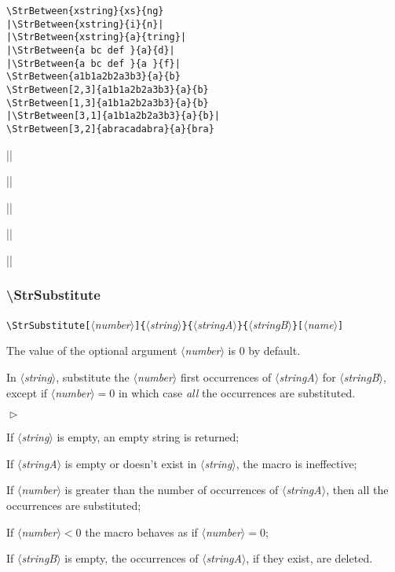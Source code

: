 \documentclass[a4paper,10pt]{article}
\newcommand\argu[1]{$\langle$\textit{#1}$\rangle$}
\newcommand\ARGU[1]{\texttt{\{}\argu{#1}\texttt{\}}}
\newcommand\arguC[1]{\texttt{[}\argu{#1}\texttt{]}}
\newenvironment{Conditions}[1][1cm]%
{\begin{list}%
	{$\vartriangleright$}%
	{\setlength{\leftmargin}{#1}
	 \setlength{\itemsep}{0pt}
	 \setlength{\parsep}{0pt}
	 \setlength{\topsep}{2ptplus3ptminus2pt}
	}}%
{\end{list}}
\newcommand\styleexemple{\small\vskip4pt}
\newcommand\verbinline{\lstinline[basicstyle=\normalsize\ttfamily]}
\begin{document}
\begin{minipage}[t]{0.65\linewidth}
\begin{lstlisting}
\StrBetween{xstring}{xs}{ng}
|\StrBetween{xstring}{i}{n}|
|\StrBetween{xstring}{a}{tring}|
|\StrBetween{a bc def }{a}{d}|
|\StrBetween{a bc def }{a }{f}|
\StrBetween{a1b1a2b2a3b3}{a}{b}
\StrBetween[2,3]{a1b1a2b2a3b3}{a}{b}
\StrBetween[1,3]{a1b1a2b2a3b3}{a}{b}
|\StrBetween[3,1]{a1b1a2b2a3b3}{a}{b}|
\StrBetween[3,2]{abracadabra}{a}{bra}
\end{lstlisting}%
\end{minipage}\hfill
\begin{minipage}[t]{0.35\linewidth}
	\styleexemple
	\par
	||\par
	||\par
	||\par
	||\par
	\par
	\par
	\par
	||\par
	\par
\end{minipage}%

\subsubsection{\ttfamily\textbackslash StrSubstitute}

\verbinline|\StrSubstitute|\arguC{number}\ARGU{string}\ARGU{stringA}\ARGU{stringB}\arguC{name}
\smallskip

The value of the optional argument \argu{number} is 0 by default.\par\smallskip

In \argu{string}, substitute the \argu{number} first occurrences of \argu{stringA} for \argu{stringB}, except if \argu{number}${}=0$ in which case \emph{all} the occurrences are substituted.

\begin{Conditions}
\item If \argu{string} is empty, an empty string is returned;
\item If \argu{stringA} is empty or doesn't exist in \argu{string}, the macro is ineffective;
\item If \argu{number} is greater than the number of occurrences of \argu{stringA}, then all the occurrences are substituted;
\item If \argu{number}${}<0$ the macro behaves as if \argu{number}${}=0$;
\item If \argu{stringB} is empty, the occurrences of \argu{stringA}, if they exist, are deleted.
\end{Conditions}
\end{document}
